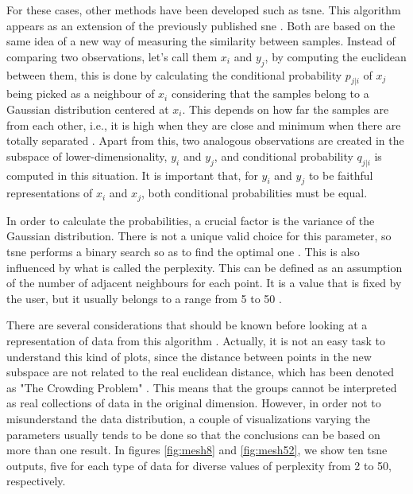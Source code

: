 	For these cases, other methods have been developed such as \acrfull{tsne}. This algorithm appears as an extension of the previously published \acrfull{sne} \cite{Hinton2003}. Both are based on the same idea of a new way of measuring the similarity between samples. Instead of comparing two observations, let's call them $x_i$ and $y_j$, by computing the euclidean between them, this is done by calculating the conditional probability $p_{j|i}$ of $x_j$ being picked as a neighbour of $x_i$ considering that the samples belong to a Gaussian distribution centered at $x_i$. This depends on how far the samples are from each other, i.e., it is high when they are close and minimum when there are totally separated \cite{VanDerMaaten2008}. Apart from this, two analogous observations are created in the subspace of lower-dimensionality, $y_i$ and $y_j$, and conditional probability $q_{j|i}$ is computed in this situation. It is important that, for $y_i$ and $y_j$ to be faithful representations of $x_i$ and $x_j$, both conditional probabilities must be equal.
	
	In order to calculate the probabilities, a crucial factor is the variance of the Gaussian distribution. There is not a unique valid choice for this parameter, so \acrshort{tsne} performs a binary search so as to find the optimal one \cite{AmatRodrigo2017}. This is also influenced by what is called the perplexity. This can be defined as an assumption of the number of adjacent neighbours for each point. It is a value that is fixed by the user, but it usually belongs to a range from 5 to 50 \cite{VanDerMaaten2008}. 
	
	There are several considerations that should be known before looking at a representation of data from this algorithm \cite{Wattenberg2016}. Actually, it is not an easy task to understand this kind of plots, since the distance between points in the new subspace are not related to the real euclidean distance, which has been denoted as "The Crowding Problem" \cite{VanDerMaaten2008}. This means that the groups cannot be interpreted as real collections of data in the original dimension. However, in order not to misunderstand the data distribution, a couple of visualizations varying the parameters usually tends to be done so that the conclusions can be based on more than one result. In figures \ref{fig:mesh8} and \ref{fig:mesh52}, we show ten \acrshort{tsne} outputs, five for each type of data for diverse values of perplexity from 2 to 50, respectively.
	
